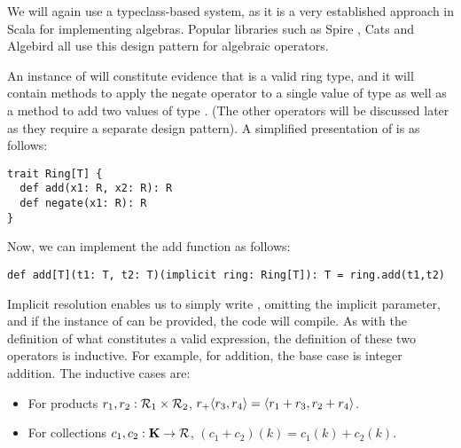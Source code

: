 We will again use a typeclass-based system, as it is a very established approach in Scala for implementing algebras. Popular libraries such as Spire \cite{spire}, Cats \cite{cats} and Algebird \cite{algebird} all use this design pattern for algebraic operators.

An instance of  will constitute evidence that  is a valid ring type, and it will contain methods to apply the negate operator to a single value of type  as well as a method to add two values of type . (The other operators will be discussed later as they require a separate design pattern). A simplified presentation of  is as follows:
\vs
\begin{lstlisting}
trait Ring[T] {
  def add(x1: R, x2: R): R
  def negate(x1: R): R
}
\end{lstlisting}\vs
Now, we can implement the add function as follows:
\vs
\begin{lstlisting}
def add[T](t1: T, t2: T)(implicit ring: Ring[T]): T = ring.add(t1,t2)
\end{lstlisting}\vs
Implicit resolution enables us to simply write , omitting the implicit parameter, and if the instance of  can be provided, the code will compile. As with the definition of what constitutes a valid expression, the definition of these two operators is inductive. For example, for addition, the base case is integer addition. The inductive cases are:
\begin{itemize}
\item{For products $r_1,r_2: \mathcal{R}_1 \times \mathcal{R}_2$, $r_ + \langle r_3, r_4 \rangle = \langle r_1 + r_3, r_2 + r_4 \rangle$.}
\item{For collections $c_1,c_2: \mathbf{K} \rightarrow \mathcal{R}$, $(c_1 + c_2)(k) = c_1(k) + c_2(k)$.}
\end{itemize}

